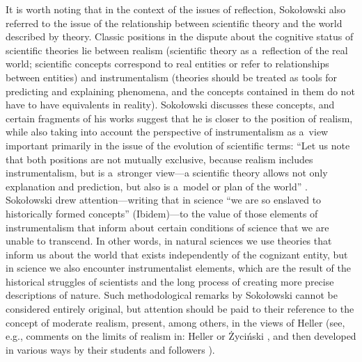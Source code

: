 \documentclass[%
  manuscript=article,
  year=2024,
  volume=77,
  doi=10.59203/zfn.77.689,
]{zfn}
\begin{document}
It is worth noting that in the context of the issues of reflection, Sokołowski also referred to the issue of the relationship between scientific theory and the world described by theory. Classic positions in the dispute about the cognitive status of scientific theories lie between realism (scientific theory as a~reflection of the real world; scientific concepts correspond to real entities or refer to relationships between entities) and instrumentalism (theories should be treated as tools for predicting and explaining phenomena, and the concepts contained in them do not have to have equivalents in reality). Sokołowski discusses these concepts, and certain fragments of his works suggest that he is closer to the position of realism, while also taking into account the perspective of instrumentalism as a~view important primarily in the issue of the evolution of scientific terms: ``Let us note that both positions are not mutually exclusive, because realism includes instrumentalism, but is a~stronger view---a scientific theory allows not only explanation and prediction, but also is a~model or plan of the world''
\parencite[][]{Sokoowski1986Pluralizm}. %
 Sokołowski drew attention---writing that in science ``we are so enslaved to historically formed concepts''
 (Ibidem)---to the value of those elements of instrumentalism that inform about certain conditions of science that we are unable to transcend. In other words, in natural sciences we use theories that inform us about the world that exists independently of the cognizant entity, but in science we also encounter instrumentalist elements, which are the result of the historical struggles of scientists and the long process of creating more precise descriptions of nature. Such methodological remarks by Sokołowski cannot be considered entirely original, but attention should be paid to their reference to the concept of moderate realism, present, among others, in the views of Heller (see, e.g., comments on the limits of realism in: Heller 
\parencite*[][pp.80–81]{Heller1992AFilozofia} %
 or Życiński 
\parencite*[e.g.,][]{Zycinski1993Granice}, %
 and then developed in various ways by their students and followers 
\parencites[e.g.,][]{Sierotowicz1997Realizm}[][]{Rodzen2005Czy}%
).
\end{document}
